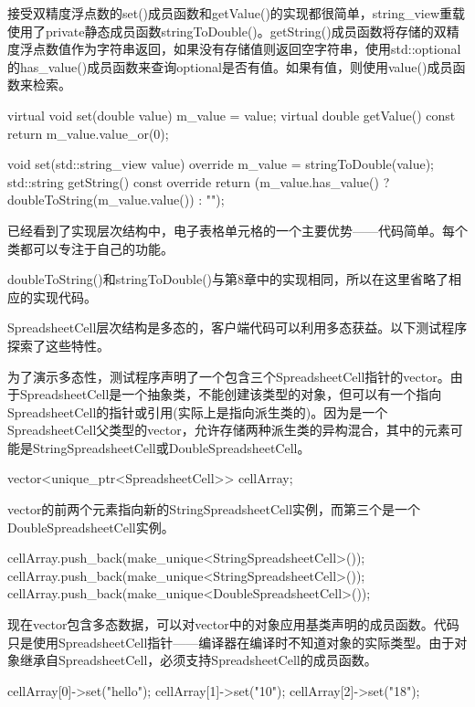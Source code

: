 接受双精度浮点数的set()成员函数和getValue()的实现都很简单，string\_view重载使用了private静态成员函数stringToDouble()。getString()成员函数将存储的双精度浮点数值作为字符串返回，如果没有存储值则返回空字符串，使用std::optional的has\_value()成员函数来查询optional是否有值。如果有值，则使用value()成员函数来检索。

\begin{cpp}
virtual void set(double value) { m_value = value; }
virtual double getValue() const { return m_value.value_or(0); }

void set(std::string_view value) override { m_value = stringToDouble(value); }
std::string getString() const override
{
    return (m_value.has_value() ? doubleToString(m_value.value()) : "");
}
\end{cpp}

已经看到了实现层次结构中，电子表格单元格的一个主要优势——代码简单。每个类都可以专注于自己的功能。

doubleToString()和stringToDouble()与第8章中的实现相同，所以在这里省略了相应的实现代码。


SpreadsheetCell层次结构是多态的，客户端代码可以利用多态获益。以下测试程序探索了这些特性。

为了演示多态性，测试程序声明了一个包含三个SpreadsheetCell指针的vector。由于SpreadsheetCell是一个抽象类，不能创建该类型的对象，但可以有一个指向SpreadsheetCell的指针或引用(实际上是指向派生类的)。因为是一个SpreadsheetCell父类型的vector，允许存储两种派生类的异构混合，其中的元素可能是StringSpreadsheetCell或DoubleSpreadsheetCell。

\begin{cpp}
vector<unique_ptr<SpreadsheetCell>> cellArray;
\end{cpp}

vector的前两个元素指向新的StringSpreadsheetCell实例，而第三个是一个DoubleSpreadsheetCell实例。

\begin{cpp}
cellArray.push_back(make_unique<StringSpreadsheetCell>());
cellArray.push_back(make_unique<StringSpreadsheetCell>());
cellArray.push_back(make_unique<DoubleSpreadsheetCell>());
\end{cpp}

现在vector包含多态数据，可以对vector中的对象应用基类声明的成员函数。代码只是使用SpreadsheetCell指针——编译器在编译时不知道对象的实际类型。由于对象继承自SpreadsheetCell，必须支持SpreadsheetCell的成员函数。

\begin{cpp}
cellArray[0]->set("hello");
cellArray[1]->set("10");
cellArray[2]->set("18");
\end{cpp}


